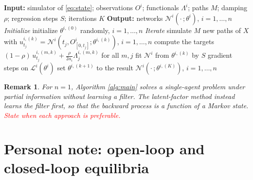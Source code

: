 \documentclass[11pt]{article}
\newtheorem{remark}{Remark}
\begin{document}
\begin{algorithm}[H]
  \caption{Deep Picard regression for a Nash equilibrium under asymmetric information}
  \label{alg:main}
  \begin{algorithmic}[1]
    \Statex \textbf{Input:} simulator of \eqref{eq:state}; observations $O^i$; functionals $\Lambda^i$; paths $M$; damping $\rho$; regression steps $S$; iterations $K$
    \Statex \textbf{Output:} networks $\mathcal{N}^i(\cdot\,; \theta^i)$, $i = 1, \dots, n$
    \Statex
    \Statex \textit{Initialize}
    \State initialize $\theta^{i,(0)}$ randomly, $i = 1, \dots, n$
    \Statex
    \Statex \textit{Iterate}
      \State simulate $M$ new paths of $X$ with $u^{i,(k)}_{t_j} = \mathcal{N}^i(t_j, O^i_{[0, t_j]}; \theta^{i,(k)})$, $i = 1, \dots, n$
        \State compute the targets $(1 - \rho)\, u^{i,(m,k)}_{t_j} + \frac{\rho}{2 a_i} \Lambda^{i,(m,k)}_j$ for all $m, j$
        \State fit $\mathcal{N}^i$ from $\theta^{i,(k)}$ by $S$ gradient steps on $\mathcal{L}^i(\theta^i)$ 
        \State set $\theta^{i,(k+1)}$ to the result
      \EndFor
    \EndFor
    \State \Return $\mathcal{N}^i(\cdot\,; \theta^{i,(K)})$, $i = 1, \dots, n$
  \end{algorithmic}
\end{algorithm}

\begin{remark}
For $n = 1$, Algorithm \ref{alg:main} solves a single-agent problem under partial information without learning a filter. The latent-factor method instead learns the filter first, so that the backward process is a function of a Markov state. \textcolor{red}{State when each approach is preferable.}
\end{remark}

\newpage
\section*{Personal note: open-loop and closed-loop equilibria}
\end{document}
